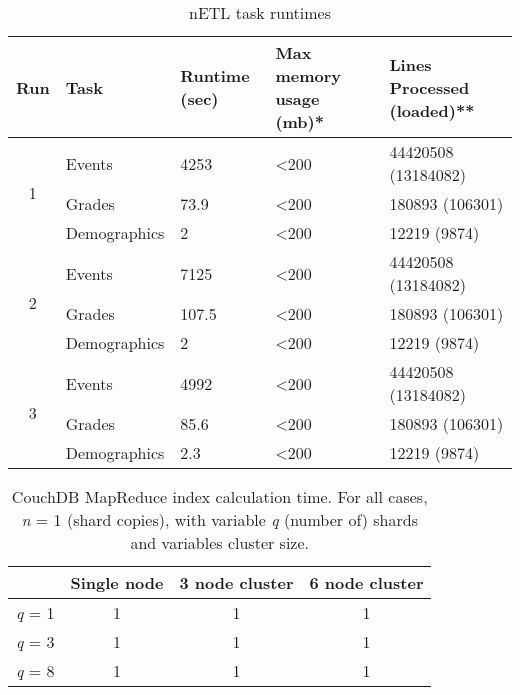 \begin{table}[]
    \centering
    \caption{nETL task runtimes}
    \label{netl-runtimes}
    \begin{tabular}{cllll}
        \multicolumn{1}{l}{Run} & Task         & Runtime (sec) & Max memory usage (mb)* & Lines Processed (loaded)** \\ \hline
        \multirow{3}{*}{1}      & Events       & 4253          & \textless 200          & 44420508 (13184082)        \\
                                & Grades       & 73.9          & \textless 200          & 180893 (106301)            \\
                                & Demographics & 2             & \textless 200          & 12219 (9874)               \\
        \multirow{3}{*}{2}      & Events       & 7125          & \textless 200          & 44420508 (13184082)        \\
                                & Grades       & 107.5         & \textless 200          & 180893 (106301)            \\
                                & Demographics & 2             & \textless 200          & 12219 (9874)               \\
        \multirow{3}{*}{3}      & Events       & 4992          & \textless 200          & 44420508 (13184082)        \\
                                & Grades       & 85.6          & \textless 200          & 180893 (106301)            \\
                                & Demographics & 2.3           & \textless 200          & 12219 (9874)               \\ \cline{2-5}
    \end{tabular}
\end{table}

\begin{table}[]
    \centering
    \caption{CouchDB MapReduce index calculation time. For all cases, \textit{n} = 1 (shard copies), with variable \textit{q} (number of) shards and variables cluster size.}
    \label{couch-indexing}
    \begin{tabular}{cccc}
                       & Single node & 3 node cluster & 6 node cluster \\ \hline
        \textit{q} = 1 & 1           & 1              & 1              \\
        \textit{q} = 3 & 1           & 1              & 1              \\
        \textit{q} = 8 & 1           & 1              & 1              \\ \hline
    \end{tabular}
\end{table}

